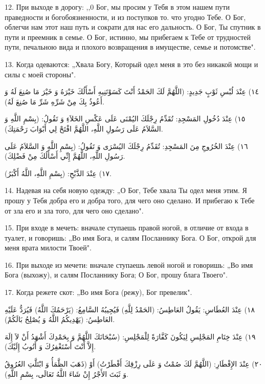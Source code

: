 \documentclass[a5paper]{article}
\begin{document}
12. При выходе в дорогу: ,,0 Бог, мы просим у Тебя в этом нашем пути праведности и богобоязненности, и из поступков то. что угодно Тебе. О Бог, облегчи нам этот наш путь и сократи для нас его дальность. О Бог, Ты спутник в пути и преемник в семье. О Бог, истинно, мы прибегаем к Тебе от трудностей пути, печальною вида и плохого возвращения в имуществе, семье и потомстве".

13. Когда одеваются: „Хвала Богу, Который одел меня в это без никакой мощи и силы с моей стороны".

١٤) عِنْدَ لُبْسِ ثَوْبٍ جَدِيدٍ: (اللَّهُمَّ لَكَ الحَمْدُ أَنْتَ كَسَوْتَنِيهِ أَسْأَلُكَ خَيْرَهُ وَ خَيْرَ مَا صُنِعَ لَهُ وَ أَعُوذُ بِكَ مِنْ شَرِّهِ شَرِّ مَا صُنِعَ لَهُ).

١٥) عِنْدَ دُخُولِ المَسْجِدِ: تُقَدِّمُ رِجْلَكَ اليُمْنَى عَلَى عَكْسِ الخَلاَءِ وَ تَقُولُ: (بِسْمِ اللَّهِ وَ السَّلاَمُ عَلَى رَسُولِ اللَّهِ، اللَّهُمَّ افْتَحْ لِي أَبْوَابَ رَحْمَتِكَ).

١٦) عِنْدَ الخُرُوجِ مِنَ المَسْجِدِ: تُقَدِّمُ رِجْلَكَ اليُسْرَى وَ تَقُولُ: (بِسْمِ اللَّهِ وَ السَّلاَمُ عَلَى رَسُولِ اللَّهِ، اللَّهُمَّ إِنِّي أَسْأَلُكَ مِنْ فَضْلِكَ).

١٧) عِنْدَ الذَّبْحِ: (بِسْمِ اللَّهِ، اللَّهُ أَكْبَرُ).

14. Надевая на себя новую одежду: „О Бог, Тебе хвала Ты одел меня этим. Я прошу у Тебя добра его и добра того, для чего оно сделано. И прибегаю к Тебе от зла его и зла того, для чего оно сделано".

15. При входе в мечеть: вначале ступаешь правой ногой, в отличие от входа в туалет, и говоришь: „Во имя Бога, и салям Посланнику Бога. О Бог, открой для меня врата милости Твоей".

16. При выходе из мечети: вначале ступаешь левой ногой и говоришь: „Во имя Бога (выхожу), и салям Посланнику Бога; О Бог, прошу блага Твоего".

17. Когда режете скот: „Во имя Бога (режу), Бог превелик".

١٨) عِنْدَ العُطَاسِ: يَقُولُ العَاطِسُ: (الحَمْدُ لِلَّهِ) فَيُجِيبُهُ السَّامِعُ: (يَرْحَمُكَ اللَّهُ) فَيُرَدُّ عَلَيْهِ العَاطِسُ: (يَهْدِيكُمُ اللَّهُ وَ يُصْلِحُ بَالَكُمْ).

١٩) عِنْدَ خِتَامِ المَجْلِسِ لِيَكُونَ كَفَّارَةً لِلْمَجْلِسِ: (سُبْحَانَكَ اللَّهُمَّ وَ بِحَمْدِكَ أَشْهَدُ أَنْ لاَ إِلَهَ إِلاَّ أَنْتَ أَسْتَغْفِرُكَ وَ أَتُوبُ إِلَيْكَ).

٢٠) عِنْدَ الإِفْطَارِ: (اللَّهُمَّ لَكَ صُمْتُ وَ عَلَى رِزْقِكَ أَفْطَرْتُ) أَوْ (ذَهَبَ الظَّمَأُ وَ ابْتَلَّتِ العُرُوقُ وَ ثَبَتَ الأَجْرُ إِنْ شَاءَ اللَّهُ تَعَالَى، بِسْمِ اللَّهِ).
\end{document}

